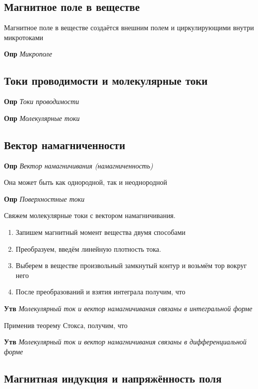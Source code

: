 \documentclass[a4paper, 14pt]{article}
\begin{document}
    \subsection{Магнитное поле в веществе}
    
    Магнитное поле в веществе создаётся внешним полем и циркулирующими внутри микротоками
    
    \textbf{Опр} \textit{Микрополе}
    
    \subsection{Токи проводимости и молекулярные токи}
    
    \textbf{Опр} \textit{Токи проводимости}
    
    \textbf{Опр} \textit{Молекулярные токи}
    
    \subsection{Вектор намагниченности}
    
    \textbf{Опр} \textit{Вектор намагничивания (намагниченность)}
    
    Она может быть как однородной, так и неоднородной
    
    \textbf{Опр} \textit{Поверхностные токи}
    
    Свяжем молекулярные токи с вектором намагничивания.
    
    \begin{enumerate}
        \item Запишем магнитный момент вещества двумя способами
        \item Преобразуем, введём линейную плотность тока.
        \item Выберем в веществе произвольный замкнутый контур и возьмём тор вокруг него
        \item После преобразований и взятия интеграла получим, что
    \end{enumerate}
    
    \textbf{Утв} \textit{Молекулярный ток и вектор намагничивания связаны в интегральной форме}
    
    Применив теорему Стокса, получим, что
    
    \textbf{Утв} \textit{Молекулярный ток и вектор намагничивания связаны в дифференциальной форме}
    
    \subsection{Магнитная индукция и напряжённость поля}
    
\end{document}
